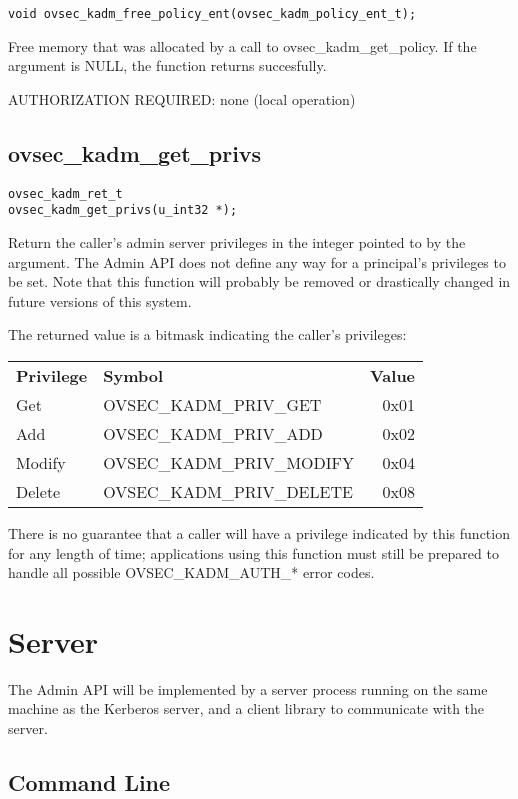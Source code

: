 \begin{verbatim}
void ovsec_kadm_free_policy_ent(ovsec_kadm_policy_ent_t);
\end{verbatim}

Free memory that was allocated by a call to ovsec_kadm_get_policy.  If
the argument is NULL, the function returns succesfully.

AUTHORIZATION REQUIRED: none (local operation)

\subsection{ovsec_kadm_get_privs}

\begin{verbatim}
ovsec_kadm_ret_t
ovsec_kadm_get_privs(u_int32 *);
\end{verbatim}

Return the caller's admin server privileges in the integer pointed to
by the argument.  The Admin API does not define any way for a
principal's privileges to be set.  Note that this function will
probably be removed or drastically changed in future versions of this
system.

The returned value is a bitmask indicating the caller's privileges:

\begin{tabular}{llr}
{\bf Privilege} & {\bf Symbol} & {\bf Value} \\
Get & OVSEC_KADM_PRIV_GET & 0x01 \\
Add & OVSEC_KADM_PRIV_ADD & 0x02 \\
Modify & OVSEC_KADM_PRIV_MODIFY & 0x04 \\
Delete & OVSEC_KADM_PRIV_DELETE & 0x08
\end{tabular}

There is no guarantee that a caller will have a privilege indicated by
this function for any length of time; applications using this function
must still be prepared to handle all possible OVSEC_KADM_AUTH_* error
codes.

\section{Server}

The Admin API will be implemented by a server process running on the
same machine as the Kerberos server, and a client library to
communicate with the server.

\subsection{Command Line}
\label{sec:commandline}

